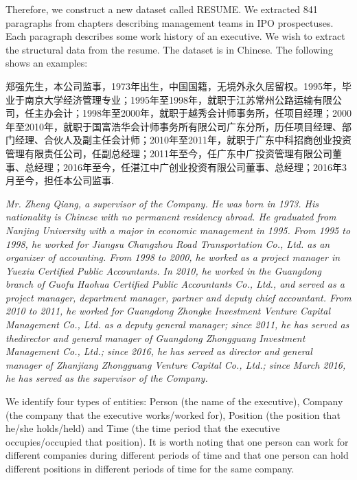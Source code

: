 \documentclass[11pt,a4paper]{article}
\begin{document}
Therefore, we construct a new dataset called RESUME.
We extracted 841 paragraphs 
 from chapters describing management teams in IPO prospectuses.
 Each paragraph  
 describes some work history of an executive. We wish to extract the structural data from the resume. 
 The dataset is in Chinese. The following shows an examples:
 
\begin{CJK*}{UTF8}{gbsn}
 郑强先生，本公司监事，1973年出生，中国国籍，无境外永久居留权。1995年，毕业于南京大学经济管理专业；1995年至1998年，就职于江苏常州公路运输有限公司，任主办会计；1998年至2000年，就职于越秀会计师事务所，任项目经理；2000年至2010年，就职于国富浩华会计师事务所有限公司广东分所，历任项目经理、部门经理、合伙人及副主任会计师；2010年至2011年，就职于广东中科招商创业投资管理有限责任公司，任副总经理；2011年至今，任广东中广投资管理有限公司董事、总经理；2016年至今，任湛江中广创业投资有限公司董事、总经理；2016年3月至今，担任本公司监事. 
\end{CJK*}

{\em Mr. Zheng Qiang, a supervisor of the Company. He was born in 1973.
His nationality is Chinese with no permanent residency abroad. 
He graduated from Nanjing University with a major in economic management in  1995. From 1995 to 1998, he worked for Jiangsu Changzhou Road Transportation Co., Ltd. as an organizer of accounting. From 1998 to 2000, he worked as a project manager in Yuexiu Certified Public Accountants. In 2010, he worked in the Guangdong branch of Guofu Haohua Certified Public Accountants Co., Ltd., and served as 
a
project manager, department manager, partner and deputy chief accountant. From 2010 to 2011, he worked for Guangdong Zhongke Investment Venture Capital Management Co., Ltd. as a deputy general manager; since 2011, he has served as  thedirector and general manager of Guangdong Zhongguang Investment Management Co., Ltd.; since 2016, he has served as director and general manager of Zhanjiang Zhongguang Venture Capital Co., Ltd.; since March 2016, he has served as the supervisor of the Company.}



We identify four types of entities: Person (the name of the executive), Company (the company that the executive works/worked for), Position (the position that he/she holds/held) and Time (the time period that the executive occupies/occupied that position). 
It is worth noting that one person can work for different companies during different periods of time and that one person can hold different positions in different periods of time for the same company. 
\end{document}
